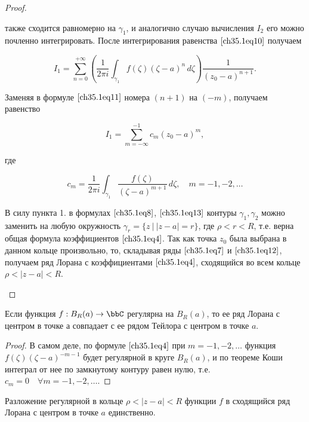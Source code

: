 \begin{proof}
\begin{enumerate}
также сходится равномерно на $\gamma_1$, и аналогично случаю вычисления $I_2$ его можно почленно интегрировать. После интегрирования равенства $\eqref{ch35.1eq10}$ получаем

\begin{equation} \label{ch35.1eq11}
I_1 = \sum\limits_{n = 0}^{+\infty} \left( \frac{1}{2\pi i} \int_{\gamma_1} f(\zeta)(\zeta - a)^n \,d\zeta\right) \frac{1}{(z_0 - a)^{n + 1}}.
\end{equation}

Заменяя в формуле $\eqref{ch35.1eq11}$ номера $(n + 1)$ на $(-m)$, получаем равенство

\begin{equation} \label{ch35.1eq12}
I_1 = \sum\limits_{m = -\infty}^{-1} c_m (z_0 - a)^m,
\end{equation}

где

\begin{equation} \label{ch35.1eq13}
c_m = \frac{1}{2\pi i} \int_{\gamma_1} \frac{f(\zeta)}{(\zeta - a)^{m + 1}} \,d\zeta, \quad m = -1,-2,\ldots
\end{equation}

В силу пункта 1. в формулах $\eqref{ch35.1eq8}$, $\eqref{ch35.1eq13}$ контуры $\gamma_1, \gamma_2$ можно заменить на любую окружность $\gamma_r = \{ z \: \big| \: |z - a| = r\}$, где $\rho < r < R$, т.е.
верна общая формула коэффициентов $\eqref{ch35.1eq4}$. Так как точка $z_0$ была выбрана в данном кольце произвольно, то, складывая ряды $\eqref{ch35.1eq7}$ и $\eqref{ch35.1eq12}$, получаем ряд Лорана с коэффициентами $\eqref{ch35.1eq4}$, сходящийся во всем кольце $\rho < |z - a| < R$.	

\end{enumerate}

\end{proof}

\begin{cons}
Если функция $f : B_R(a) \to \bbC$ регулярна на $B_R(a)$, то ее ряд Лорана с центром в точке а совпадает с ее рядом Тейлора с центром в точке $a$.
\end{cons}
\begin{proof}
В самом деле, по формуле $\eqref{ch35.1eq4}$ при $m = -1,-2, \ldots$ функция $f(\zeta)(\zeta - a)^{-m-1}$ будет регулярной в круге $B_R(a)$, и по теореме Коши интеграл от нее по замкнутому контуру равен нулю, т.е. $c_m = 0 \quad \forall m = -1,-2, \ldots$.
\end{proof}

\begin{thm} \label{ch35.1Thm2}
Разложение регулярной в кольце $\rho < |z - a| < R$ функции $f$ в сходящийся ряд Лорана с центром в точке $a$ единственно.
\end{thm}

